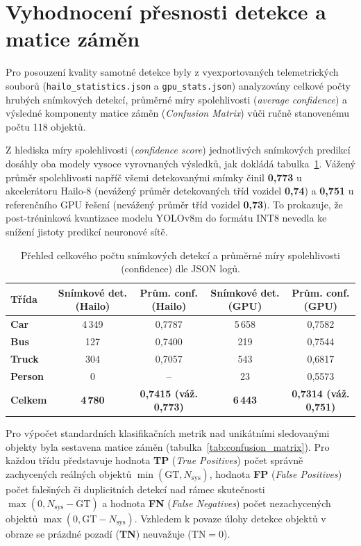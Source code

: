 \documentclass[male,czech,api_bc]{kitheses}
\renewcommand{\arraystretch}{1.23}
\begin{document}
\section{Vyhodnocení přesnosti detekce a matice záměn}
Pro posouzení kvality samotné detekce byly z vyexportovaných telemetrických souborů (\texttt{hailo\_statistics.json} a \texttt{gpu\_stats.json}) analyzovány celkové počty hrubých snímkových detekcí, průměrné míry spolehlivosti (\textit{average confidence}) a výsledné komponenty matice záměn (\textit{Confusion Matrix}) vůči ručně stanovenému počtu 118 objektů.

Z hlediska míry spolehlivosti (\textit{confidence score}) jednotlivých snímkových predikcí dosáhly oba modely vysoce vyrovnaných výsledků, jak dokládá tabulka~\ref{tab:confidence_stats}. Vážený průměr spolehlivosti napříč všemi detekovanými snímky činil \textbf{0,773} u akcelerátoru Hailo-8 (nevážený průměr detekovaných tříd vozidel \textbf{0,74}) a \textbf{0,751} u referenčního GPU řešení (nevážený průměr tříd vozidel \textbf{0,73}). To prokazuje, že post-tréninková kvantizace modelu YOLOv8m do formátu INT8 nevedla ke snížení jistoty predikcí neuronové sítě.

\begin{table}[H]
    \centering
    \small\renewcommand{\arraystretch}{1.2}
    \setlength{\tabcolsep}{3pt}
    \begin{tabular}{|l|c|c|c|c|}
        \hline
        \textbf{Třída} & \textbf{Snímkové det. (Hailo)} & \textbf{Prům. conf. (Hailo)} & \textbf{Snímkové det. (GPU)} & \textbf{Prům. conf. (GPU)} \\ \hline
        \textbf{Car} & 4\,349 & 0,7787 & 5\,658 & 0,7582 \\ \hline
        \textbf{Bus} & 127 & 0,7400 & 219 & 0,7544 \\ \hline
        \textbf{Truck} & 304 & 0,7057 & 543 & 0,6817 \\ \hline
        \textbf{Person} & 0 & -- & 23 & 0,5573 \\ \hline \hline
        \textbf{Celkem} & \textbf{4\,780} & \textbf{0,7415 (váž. 0,773)} & \textbf{6\,443} & \textbf{0,7314 (váž. 0,751)} \\ \hline
    \end{tabular}
    \caption{Přehled celkového počtu snímkových detekcí a průměrné míry spolehlivosti (confidence) dle JSON logů.}
    \label{tab:confidence_stats}
\end{table}

Pro výpočet standardních klasifikačních metrik nad unikátními sledovanými objekty byla sestavena matice záměn (tabulka~\ref{tab:confusion_matrix}). Pro každou třídu představuje hodnota \textbf{TP} (\textit{True Positives}) počet správně zachycených reálných objektů $\min(\text{GT}, N_{\text{sys}})$, hodnota \textbf{FP} (\textit{False Positives}) počet falešných či duplicitních detekcí nad rámec skutečnosti $\max(0, N_{\text{sys}} - \text{GT})$ a hodnota \textbf{FN} (\textit{False Negatives}) počet nezachycených objektů $\max(0, \text{GT} - N_{\text{sys}})$. Vzhledem k povaze úlohy detekce objektů v obraze se prázdné pozadí (\textbf{TN}) neuvažuje ($\text{TN} = 0$).
\end{document}
